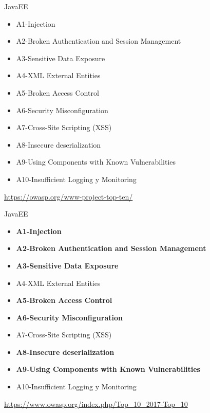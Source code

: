 \documentclass[aspectratio=169]{beamer}
\begin{document}
\begin{frame}{JavaEE}
    \begin{itemize}
        \item A1-Injection
        \item A2-Broken Authentication and Session Management
        \item A3-Sensitive Data Exposure
        \item A4-XML External Entities
        \item A5-Broken Access Control
        \item A6-Security Misconfiguration
        \item A7-Cross-Site Scripting (XSS)
        \item A8-Insecure deserialization
        \item A9-Using Components with Known Vulnerabilities
        \item A10-Insufficient Logging y Monitoring
    \end{itemize}
    \url{https://owasp.org/www-project-top-ten/}
\end{frame}

\begin{frame}{JavaEE}
    \begin{itemize}
        \item \textbf{A1-Injection}
        \item \textbf{A2-Broken Authentication and Session Management}
        \item \textbf{A3-Sensitive Data Exposure}
        \item A4-XML External Entities
        \item \textbf{A5-Broken Access Control}
        \item \textbf{A6-Security Misconfiguration}
        \item A7-Cross-Site Scripting (XSS)
        \item \textbf{A8-Insecure deserialization}
        \item \textbf{A9-Using Components with Known Vulnerabilities}
        \item A10-Insufficient Logging y Monitoring
    \end{itemize}
    \url{https://www.owasp.org/index.php/Top_10_2017-Top_10}
\end{frame}
\end{document}
